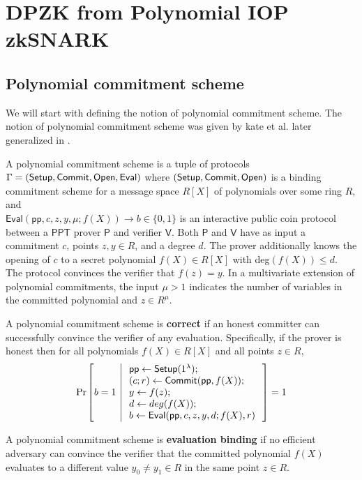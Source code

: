 \documentclass[runningheads]{llncs}
\def\commit{\mathsf{Commit}}
\def\open{\mathsf{Open}}
\def\eval{\mathsf{Eval}}
\def\pp{\mathsf{pp}}
\def\bitset{\{0,1\}}
\def\ppt{\mathsf{PPT}}
\def\prover{\mathsf{P}}
\def\verifier{\mathsf{V}}
\begin{document}
\section{DPZK from Polynomial IOP zkSNARK}
\subsection{Polynomial commitment scheme}
We will start with defining the notion of polynomial commitment scheme. The notion of polynomial commitment scheme was given by kate et al. \cite{KGZ10} later generalized in \cite{DARK19}.
\begin{definition}\label{defn:polycomm}
A polynomial commitment scheme is a tuple of protocols $\Gamma =(\setup, \commit, \open, \eval)$ where $(\setup, \commit, \open)$ is a binding commitment scheme for a message space $R[X]$ of polynomials over some ring $R$, and 
\\ $\eval(\pp, c, z, y, \mu; f(X)) \rightarrow b \in \bitset$ is an interactive public coin protocol between a $\ppt$ prover $\prover$ and verifier $\verifier$. Both $\prover$ and $\verifier$ have as input a commitment $c$, points $z,y\in R$, and a degree $d$. The prover additionally knows the opening of $c$ to a secret polynomial $f(X)\in R[X]$ with deg$(f(X))\leq d$. The protocol convinces the verifier that $f(z)=y$. In a multivariate extension of polynomial commitments, the input $\mu > 1$ indicates the number of variables in the committed polynomial and $z\in R^{\mu}$.  
\end{definition}

A polynomial commitment scheme is \textbf{correct} if an honest committer can successfully convince the verifier of any evaluation. Specifically, if the prover is honest then for all polynomials $f(X) \in R[X]$ and all points $z\in R$,
\begin{align*}
\condprob{b=1}{
	\begin{array}{l}
	\pp \leftarrow \setup (\secparam); \\
	(c;r)\leftarrow\commit(\pp, f(X)); \\
	y \leftarrow f(z);\\
	d \leftarrow deg(f(X));\\
	b\leftarrow \eval(\pp, c,z,y,d;f(X),r)
	\end{array}
} = 1
\end{align*}

A polynomial commitment scheme is \textbf{evaluation binding} if no efficient adversary can convince the verifier that the committed polynomial $f(X)$ evaluates to a different value $y_0 \neq y_1 \in R$ in the same point $z\in R$.
\end{document}
